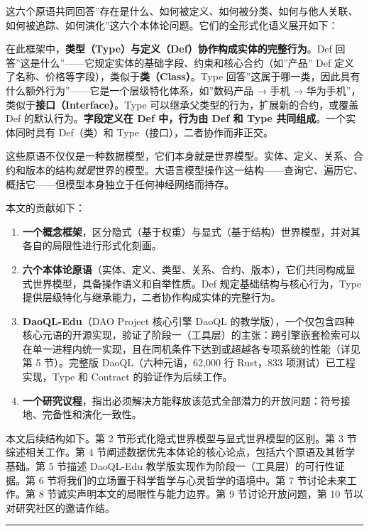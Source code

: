 \documentclass[11pt,a4paper]{ctexart}
\begin{document}
这六个原语共同回答''存在是什么、如何被定义、如何被分类、如何与他人关联、如何被追踪、如何演化''这六个本体论问题。它们的全形式化语义展开如下：

在此框架中，\textbf{类型（Type）与定义（Def）协作构成实体的完整行为}。Def
回答''这是什么''------它规定实体的基础字段、约束和核心合约（如''产品''
Def 定义了名称、价格等字段），类似于\textbf{类（Class）}。Type
回答''这属于哪一类，因此具有什么额外行为''------它是一个层级特化体系，如''数码产品
→ 手机 → 华为手机''，类似于\textbf{接口（Interface）}。Type
可以继承父类型的行为，扩展新的合约，或覆盖 Def
的默认行为。\textbf{字段定义在 Def 中，行为由 Def 和 Type
共同组成}。一个实体同时具有 Def（类）和 Type（接口），二者协作而非正交。

这些原语不仅仅是一种数据模型，它们本身就是世界模型。实体、定义、关系、合约和版本的结构\emph{就是}世界的模型。大语言模型操作这一结构------查询它、遍历它、概括它------但模型本身独立于任何神经网络而持存。

本文的贡献如下：

\begin{enumerate}
\def\labelenumi{\arabic{enumi}.}
\item
  \textbf{一个概念框架}，区分隐式（基于权重）与显式（基于结构）世界模型，并对其各自的局限性进行形式化刻画。
\item
  \textbf{六个本体论原语}（实体、定义、类型、关系、合约、版本），它们共同构成显式世界模型，具备操作语义和自举性质。Def
  规定基础结构与核心行为，Type
  提供层级特化与继承能力，二者协作构成实体的完整行为。
\item
  \textbf{DaoQL-Edu}（DAO Project 核心引擎 DaoQL
  的教学版），一个仅包含四种核心元语的开源实现，验证了阶段一（工具层）的主张：跨引擎嵌套检索可以在单一进程内统一实现，且在同机条件下达到或超越各专项系统的性能（详见第
  5 节）。完整版 DaoQL（六种元语，62,000 行 Rust，833
  项测试）已工程实现，Type 和 Contract 的验证作为后续工作。
\item
  \textbf{一个研究议程}，指出必须解决方能释放该范式全部潜力的开放问题：符号接地、完备性和演化一致性。
\end{enumerate}

本文后续结构如下。第 2 节形式化隐式世界模型与显式世界模型的区别。第 3
节综述相关工作。第 4
节阐述数据优先本体论的核心论点，包括六个原语及其哲学基础。第 5 节描述
DaoQL-Edu 教学版实现作为阶段一（工具层）的可行性证据。第 6
节将我们的立场置于科学哲学与心灵哲学的语境中。第 7 节讨论未来工作。第 8
节诚实声明本文的局限性与能力边界。第 9 节讨论开放问题，第 10
节以对研究社区的邀请作结。

\begin{center}\rule{0.5\linewidth}{0.5pt}\end{center}
\end{document}
